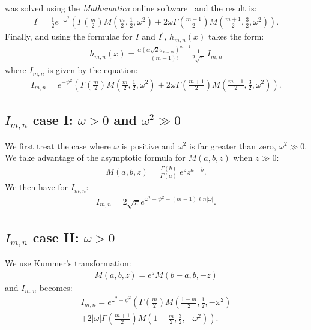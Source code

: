 \documentclass[preprint,12pt]{elsarticle}
\begin{document}
was solved using the \emph{Mathematica} online software~\cite{math} and the result is:
\begin{align}
I^\prime = \frac{1}{2} e^{-\omega^2} 
\left(  \Gamma\left( \frac{m}{2} \right) M\left( \frac{m}{2}, \frac{1}{2}, \omega^2 \right)  + 2\omega \Gamma\left( \frac{m+1}{2} \right) M\left(\frac{m+1}{2}, \frac{3}{2}, \omega^2  \right)  \right).  
\end{align}
Finally, and using the formulae for $I$ and $I^\prime$, $h_{m,n}(x)$ takes the form:
\begin{align}
h_{m,n}(x) =  \frac{ \alpha (\alpha\sqrt{2} \sigma_{n-m})^{m-1}}{(m-1)!} \frac{1}{2\sqrt{\pi}} \  I_{m,n}
\end{align} 
where $I_{m,n}$  is given by the equation:
\begin{align}
I_{m,n} = e^{-\psi^2} \left( \Gamma\left( \frac{m}{2} \right) M\left( \frac{m}{2}, \frac{1}{2}, \omega^2 \right)  + 2\omega \Gamma\left( \frac{m+1}{2} \right) M\left(\frac{m+1}{2}, \frac{3}{2}, \omega^2 \right) \right).  
\end{align}

\subsection*{$I_{m,n}$ case I: $\omega> 0$ and $\omega^2 \gg 0$ }
%

We first treat the case where $\omega$ is positive and $\omega^2$ is far greater than zero, $\omega^2 \gg 0$.  
We take advantage of the asymptotic formula for $M(a,b,z)$ when $z \gg 0$:
\begin{align}
M(a,b,z) = \frac{\Gamma (b)}{\Gamma(a)} \  e^z z^{a-b}.
\end{align}
We then have for $I_{m,n}$:
\begin{align}
 I_{m,n} = 2\sqrt{\pi}   e^{\omega^2 - \psi^2 + (m-1) \ell n |\omega|}.
\end{align}

\subsection*{$I_{m,n}$ case II: $\omega >0$}
%

We use Kummer's transformation:
\begin{align}
M(a,b,z) = e^z M(b-a,b,-z)
\end{align}
and $I_{m,n}$ becomes:
\begin{align}
I_{m,n} = e^{\omega^2 -\psi^2 } \left(  \Gamma\left( \frac{m}{2} \right) M\left(\frac{1-m}{2}, \frac{1}{2}, -\omega^2 \right)  \nonumber \right. \\ \left. + 2|\omega| \Gamma\left( \frac{m+1}{2} \right) M\left(1-\frac{m}{2}, \frac{3}{2}, -\omega^2 \right)     \right).
\end{align}
\end{document}
